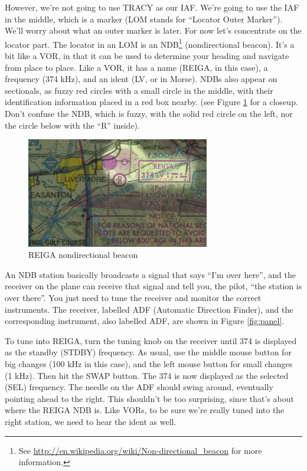 However, we're not going to use TRACY as our IAF.  We're going to use
the IAF in the middle, which is a marker (LOM stands for ``Locator
Outer Marker'').  We'll worry about what an outer marker is later.
For now let's concentrate on the locator part.  The locator in an LOM
is an NDB\footnote{See
  \url{http://en.wikipedia.org/wiki/Non-directional_beacon} for more
  information.} (nondirectional beacon).  It's a bit like a VOR, in
that it can be used to determine your heading and navigate from place
to place.  Like a VOR, it has a name (REIGA, in this case), a
frequency (374 kHz), and an ident (LV, or
{\mdot\mdash\mdot\mdot\mspace \mdot\mdot\mdot\mdash} in Morse).  NDBs
also appear on sectionals, as fuzzy red circles with a small circle in
the middle, with their identification information placed in a red box
nearby. (see Figure \ref{fig:NDB} for a closeup.  Don't confuse the
NDB, which is fuzzy, with the solid red circle on the left, nor the
circle below with the ``R'' inside).


\begin{figure}
  \begin{center}
    \includegraphics[width=8cm]{img/NDB}
    \caption{REIGA nondirectional beacon}
    \label{fig:NDB}
  \end{center}
\end{figure}

An NDB station basically broadcasts a signal that says ``I'm over
here'', and the receiver on the plane can receive that signal and tell
you, the pilot, ``the station is over there''.  You just need to tune
the receiver and monitor the correct instruments.  The receiver,
labelled ADF (Automatic Direction Finder), and the corresponding
instrument, also labelled ADF, are shown in Figure \ref{fig:panel}.

To tune into REIGA, turn the tuning knob on the receiver until 374 is
displayed as the standby (STDBY) frequency.  As usual, use the middle
mouse button for big changes (100 kHz in this case), and the left
mouse button for small changes (1 kHz).  Then hit the SWAP button.
The 374 is now displayed as the selected (SEL) frequency.  The needle
on the ADF should swing around, eventually pointing ahead to the
right.  This shouldn't be too surprising, since that's about where the
REIGA NDB is.  Like VORs, to be sure we're really tuned into the right
station, we need to hear the ident as well.

